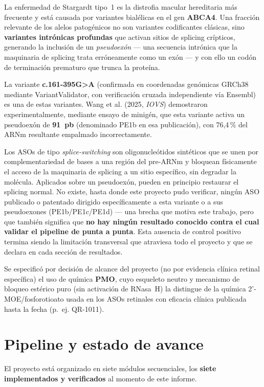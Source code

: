 \documentclass[11pt,a4paper]{article}
\begin{document}
La enfermedad de Stargardt tipo~1 es la distrofia macular hereditaria más frecuente y está causada por variantes bialélicas en el gen \textbf{ABCA4}. Una fracción relevante de los alelos patogénicos no son variantes codificantes clásicas, sino \textbf{variantes intrónicas profundas} que activan sitios de splicing crípticos, generando la inclusión de un \emph{pseudoexón} --- una secuencia intrónica que la maquinaria de splicing trata erróneamente como un exón --- y con ello un codón de terminación prematuro que trunca la proteína.

La variante \textbf{c.161-395G>A} (confirmada en coordenadas genómicas GRCh38 mediante VariantValidator, con verificación cruzada independiente vía Ensembl) es una de estas variantes. Wang et al. (2025, \emph{IOVS}) demostraron experimentalmente, mediante ensayo de minigén, que esta variante activa un pseudoexón de \textbf{91~pb} (denominado PE1b en esa publicación), con 76{,}4\,\% del ARNm resultante empalmado incorrectamente.

Los ASOs de tipo \emph{splice-switching} son oligonucleótidos sintéticos que se unen por complementariedad de bases a una región del pre-ARNm y bloquean físicamente el acceso de la maquinaria de splicing a un sitio específico, sin degradar la molécula. Aplicados sobre un pseudoexón, pueden en principio restaurar el splicing normal. No existe, hasta donde este proyecto pudo verificar, ningún ASO publicado o patentado dirigido específicamente a esta variante o a sus pseudoexones (PE1b/PE1c/PE1d) --- una brecha que motiva este trabajo, pero que también significa que \textbf{no hay ningún resultado conocido contra el cual validar el pipeline de punta a punta}. Esta ausencia de control positivo termina siendo la limitación transversal que atraviesa todo el proyecto y que se declara en cada sección de resultados.

Se especificó por decisión de alcance del proyecto (no por evidencia clínica retinal específica) el uso de química \textbf{PMO}, cuyo esqueleto neutro y mecanismo de bloqueo estérico puro (sin activación de RNasa~H) la distingue de la química 2'-MOE/fosforotioato usada en los ASOs retinales con eficacia clínica publicada hasta la fecha (p.~ej. QR-1011).

\section{Pipeline y estado de avance}

El proyecto está organizado en siete módulos secuenciales, los \textbf{siete implementados y verificados} al momento de este informe.
\end{document}
